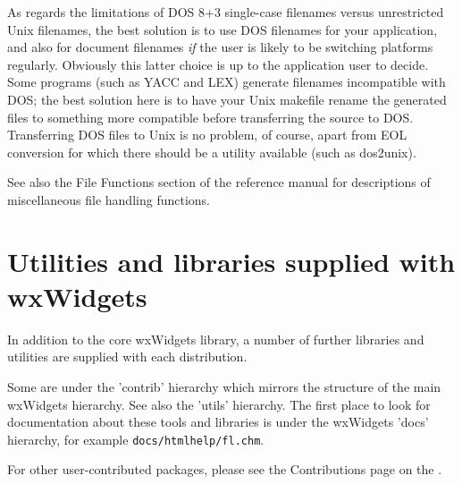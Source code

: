 As regards the limitations of DOS 8+3 single-case filenames versus
unrestricted Unix filenames, the best solution is to use DOS filenames
for your application, and also for document filenames {\it if} the user
is likely to be switching platforms regularly. Obviously this latter
choice is up to the application user to decide.  Some programs (such as
YACC and LEX) generate filenames incompatible with DOS; the best
solution here is to have your Unix makefile rename the generated files
to something more compatible before transferring the source to DOS.
Transferring DOS files to Unix is no problem, of course, apart from EOL
conversion for which there should be a utility available (such as
dos2unix).

See also the File Functions section of the reference manual for
descriptions of miscellaneous file handling functions.

\chapter{Utilities and libraries supplied with wxWidgets}\label{utilities}
%
\setfooter{\thepage}{}{}{}{}{\thepage}%

In addition to the core wxWidgets library, a number of further
libraries and utilities are supplied with each distribution.

Some are under the 'contrib' hierarchy which mirrors the
structure of the main wxWidgets hierarchy. See also the 'utils'
hierarchy. The first place to look for documentation about
these tools and libraries is under the wxWidgets 'docs' hierarchy,
for example {\tt docs/htmlhelp/fl.chm}.

For other user-contributed packages, please see the Contributions page
on the .

